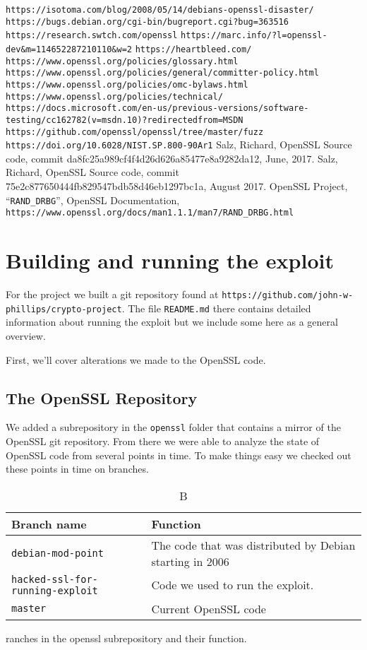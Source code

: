 \documentclass[conference]{IEEEtran}
\begin{document}
\begin{thebibliography}{00}
 \verb|https://isotoma.com/blog/2008/05/14/debians-openssl-disaster/|
 \verb|https://bugs.debian.org/cgi-bin/bugreport.cgi?bug=363516|
 \verb|https://research.swtch.com/openssl|
 \verb|https://marc.info/?l=openssl-dev&m=114652287210110&w=2|
 \verb|https://heartbleed.com/|
 \verb|https://www.openssl.org/policies/glossary.html|
 \verb|https://www.openssl.org/policies/general/committer-policy.html|
 \verb|https://www.openssl.org/policies/omc-bylaws.html|
 \verb|https://www.openssl.org/policies/technical/|
 \verb|https://docs.microsoft.com/en-us/previous-versions/software-testing/cc162782(v=msdn.10)?redirectedfrom=MSDN|
 \verb|https://github.com/openssl/openssl/tree/master/fuzz|
 \verb|https://doi.org/10.6028/NIST.SP.800-90Ar1|
 Salz, Richard, OpenSSL Source code, commit da8fc25a989cf4f4d26d626a85477e8a9282da12, June, 2017.
 Salz, Richard, OpenSSL Source code, commit 75e2c877650444fb829547bdb58d46eb1297bc1a, August 2017.
 OpenSSL Project, ``\verb|RAND_DRBG|'', OpenSSL
  Documentation,
  \verb|https://www.openssl.org/docs/man1.1.1/man7/RAND_DRBG.html|
\end{thebibliography}
\appendices{}
\section{Building and running the exploit}
For the project we built a git repository found at
\verb|https://github.com/john-w-phillips/crypto-project|. The file
\verb|README.md| there contains detailed information about running the
exploit but we include some here as a general overview.

First, we'll cover alterations we made to the OpenSSL code.

\subsection{The OpenSSL Repository}
We added a subrepository in the \verb|openssl| folder that contains a
mirror of the OpenSSL git repository. From there we were able to
analyze the state of OpenSSL code from several points in time. To make
things easy we checked out these points in time on branches.

\begin{table}[!bp]
  \centering
  \begin{tabular}{|l|l|}
    \hline
    Branch name & Function \\ \hline
    \verb|debian-mod-point| & The code that was distributed by Debian starting in 2006 \\ \hline
    \verb|hacked-ssl-for-running-exploit| & Code we used to run the exploit. \\ \hline
    \verb|master| & Current OpenSSL code \\ \hline
  \end{tabular}
  \caption Branches in the openssl subrepository and their function.
\end{table}
\end{document}
